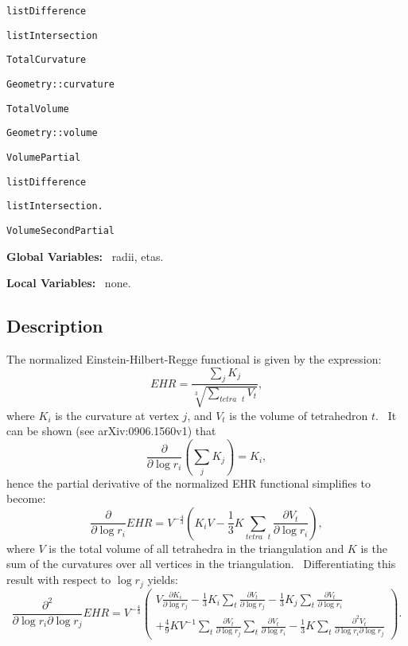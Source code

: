 \qquad\qquad\texttt{listDifference}

\qquad\qquad\texttt{listIntersection}

\qquad \texttt{TotalCurvature}

\qquad\qquad\texttt{Geometry::curvature}

\qquad \texttt{TotalVolume}

\qquad\qquad\texttt{Geometry::volume}

\qquad \texttt{VolumePartial}

\qquad\qquad\texttt{listDifference}

\qquad\qquad\texttt{listIntersection.}

\qquad \texttt{VolumeSecondPartial}

\textbf{Global Variables: }\ radii, etas.

\textbf{Local Variables:} \ none.

\subsection*{Description}

The normalized Einstein-Hilbert-Regge functional is given by the expression:%
\begin{equation*}
EHR=\frac{\sum\limits_{j}K_{j}}{\sqrt[3]{\sum\limits_{tetra\text{ }t}V_{t}}},
\end{equation*}
where $K_{i}$ is the curvature at vertex $j$, and $V_{t}$ is the volume of
tetrahedron $t$. \ It can be shown (see arXiv:0906.1560v1) that 
\begin{equation*}
\frac{\partial}{\partial\log r_{i}}\left( \sum\limits_{j}K_{j}\right) =K_{i},
\end{equation*}
hence the partial derivative of the normalized EHR functional simplifies to
become:%
\begin{equation*}
\frac{\partial}{\partial\log r_{i}}EHR=V^{-\frac{4}{3}}\left( K_{i}V-\frac {1%
}{3}K\sum\limits_{tetra\text{ }t}\frac{\partial V_{t}}{\partial\log r_{i}}%
\right) ,
\end{equation*}
where $V$ is the total volume of all tetrahedra in the triangulation and $K$
is the sum of the curvatures over all vertices in the triangulation. \
Differentiating this result with respect to $\log r_{j}$ yields:%
\begin{equation*}
\frac{\partial^{2}}{\partial\log r_{i}\partial\log r_{j}}EHR=V^{-\frac{4}{3}%
}\left( 
\begin{array}{c}
V\frac{\partial K_{i}}{\partial\log r_{j}}-\frac{1}{3}K_{i}\sum\limits_{t}%
\frac{\partial V_{t}}{\partial\log r_{j}}-\frac{1}{3}K_{j}\sum\limits_{t}%
\frac{\partial V_{t}}{\partial\log r_{i}} \\ 
+\frac{4}{9}KV^{-1}\sum\limits_{t}\frac{\partial V_{t}}{\partial\log r_{j}}%
\sum\limits_{t}\frac{\partial V_{t}}{\partial\log r_{i}}-\frac{1}{3}%
K\sum\limits_{t}\frac{\partial^{2}V_{t}}{\partial\log r_{i}\partial\log r_{j}%
}%
\end{array}
\right) .
\end{equation*}

